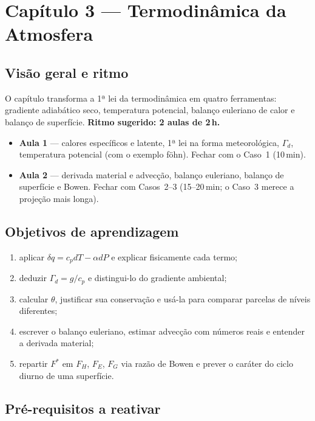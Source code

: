 \section{Capítulo 3 --- Termodinâmica da Atmosfera}

\subsection*{Visão geral e ritmo}

O capítulo transforma a 1ª lei da termodinâmica em quatro ferramentas:
gradiente adiabático seco, temperatura potencial, balanço euleriano de
calor e balanço de superfície. \textbf{Ritmo sugerido: 2 aulas de 2\,h.}

\begin{itemize}
  \item \textbf{Aula 1} — calores específicos e latente, 1ª lei na forma
        meteorológica, $\Gamma_d$, temperatura potencial (com o exemplo
        föhn). Fechar com o Caso~1 (10\,min).
  \item \textbf{Aula 2} — derivada material e advecção, balanço euleriano,
        balanço de superfície e Bowen. Fechar com Casos~2--3 (15--20\,min;
        o Caso~3 merece a projeção mais longa).
\end{itemize}

\subsection*{Objetivos de aprendizagem}

\begin{enumerate}
  \item aplicar $\delta q = c_p dT - \alpha dP$ e explicar fisicamente cada
        termo;
  \item deduzir $\Gamma_d = g/c_p$ e distingui-lo do gradiente ambiental;
  \item calcular $\theta$, justificar sua conservação e usá-la para comparar
        parcelas de níveis diferentes;
  \item escrever o balanço euleriano, estimar advecção com números reais e
        entender a derivada material;
  \item repartir $F^*$ em $F_H$, $F_E$, $F_G$ via razão de Bowen e prever o
        caráter do ciclo diurno de uma superfície.
\end{enumerate}

\subsection*{Pré-requisitos a reativar}

